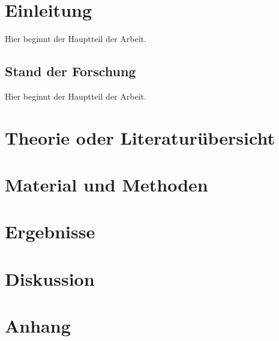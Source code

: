 \documentclass[a4paper,12pt,twoside]{article}
\begin{document}
	
	\newpage
	\pagestyle{standard} %
	\section{Einleitung}
	Hier beginnt der Hauptteil der Arbeit.
	\subsection{Stand der Forschung}
	Hier beginnt der Hauptteil der Arbeit.
	
	
	\newpage
	\section{Theorie oder Literaturübersicht}
	
	\newpage
	\section{Material und Methoden}
	
	\newpage
	\section{Ergebnisse}
	
	\newpage
	\section{Diskussion}
	
	
	\newpage
	\pagestyle{plain} %
	\printbibliography
	
	
	\newpage
	\pagestyle{plain} %
	\listoffigures
	
	
	\newpage
	\pagestyle{plain} %
	\listoftables
	
	
	\newpage
	\appendix
	\pagestyle{appendix}   %
	\section*{Anhang}
	\renewcommand{\thesubsection}{Anhang \Alph{subsection}}
	
	
\end{document}
